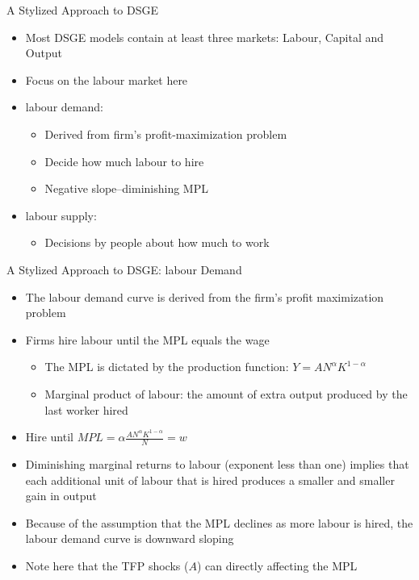 \documentclass[aspectratio=1610]{beamer}
\begin{document}
\begin{frame}[wide]{A Stylized Approach to DSGE}
	\begin{itemize}
		\item Most DSGE models contain at least three markets: Labour, Capital and 	Output
		\item Focus on the labour market here
		\item labour demand: 
		\begin{itemize}
			\item Derived from firm’s profit-maximization problem
			\item Decide how much labour to hire
			\item Negative slope–diminishing MPL
		\end{itemize}
		\item labour supply:
		\begin{itemize}
			\item Decisions by people about how much to work
		\end{itemize}
		
	\end{itemize}
\end{frame}


\begin{frame}[wide]{A Stylized Approach to DSGE: labour Demand}
	\begin{itemize}
		\item The labour demand curve is derived from the firm’s profit maximization problem
		\item Firms hire labour until the MPL equals the wage
		\begin{itemize}
			\item The MPL is dictated by the production function: $Y = AN^\alpha K^{1-\alpha}$
			\item  Marginal product of labour: the amount of extra output produced by the last worker hired
		\end{itemize}
		\item Hire until $MPL= \alpha \frac{A N^\alpha K^{1-\alpha}}{N} = w$
		\item Diminishing marginal returns to labour (exponent less than one) implies that each additional unit of labour that is hired produces a smaller and smaller gain in output
		\item Because of the assumption that the MPL declines as more labour is hired, the labour demand curve is downward sloping
		\item Note here that the TFP shocks ($A$) can directly affecting the MPL
		
	\end{itemize}
\end{frame}
\end{document}
